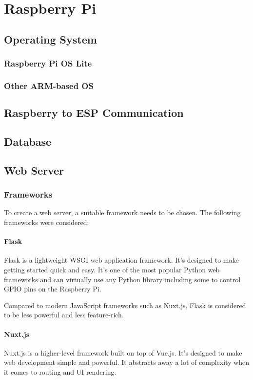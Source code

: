 \chapter{Raspberry Pi}
    \section{Operating System}
        \subsection{Raspberry Pi OS Lite}
        \subsection{Other ARM-based OS}
    \section{Raspberry to ESP Communication}
    \section{Database}
    \section{Web Server}
        \subsection{Frameworks}
        To create a web server, a suitable framework needs
        to be chosen. The following frameworks were considered:

            \subsubsection{Flask}
            Flask is a lightweight WSGI web application framework.
            It's designed to make getting started quick and easy. 
            It's one of the most popular Python web frameworks and
            can virtually use any Python library including some
            to control GPIO pins on the Raspberry Pi.

            Compared to modern JavaScript frameworks such as Nuxt.js, 
            Flask is considered to be less powerful and less 
            feature-rich.

            \subsubsection{Nuxt.js}
            Nuxt.js is a higher-level framework built on top of Vue.js.
            It's designed to make web development simple and powerful.
            It abstracts away a lot of complexity when it comes to 
            routing and UI rendering.
            
